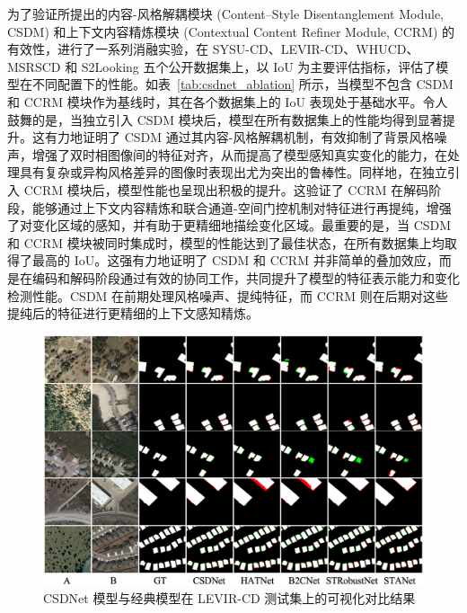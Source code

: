 为了验证所提出的内容-风格解耦模块 (Content–Style Disentanglement Module, CSDM) 和上下文内容精炼模块 (Contextual Content Refiner Module, CCRM) 的有效性，进行了一系列消融实验，在 SYSU-CD、LEVIR-CD、WHUCD、MSRSCD 和 S2Looking 五个公开数据集上，以 IoU 为主要评估指标，评估了模型在不同配置下的性能。如表~\ref{tab:csdnet_ablation} 所示，当模型不包含 CSDM 和 CCRM 模块作为基线时，其在各个数据集上的 IoU 表现处于基础水平。令人鼓舞的是，当独立引入 CSDM 模块后，模型在所有数据集上的性能均得到显著提升。这有力地证明了 CSDM 通过其内容-风格解耦机制，有效抑制了背景风格噪声，增强了双时相图像间的特征对齐，从而提高了模型感知真实变化的能力，在处理具有复杂或异构风格差异的图像时表现出尤为突出的鲁棒性。同样地，在独立引入 CCRM 模块后，模型性能也呈现出积极的提升。这验证了 CCRM 在解码阶段，能够通过上下文内容精炼和联合通道-空间门控机制对特征进行再提纯，增强了对变化区域的感知，并有助于更精细地描绘变化区域。最重要的是，当 CSDM 和 CCRM 模块被同时集成时，模型的性能达到了最佳状态，在所有数据集上均取得了最高的 IoU。这强有力地证明了 CSDM 和 CCRM 并非简单的叠加效应，而是在编码和解码阶段通过有效的协同工作，共同提升了模型的特征表示能力和变化检测性能。CSDM 在前期处理风格噪声、提纯特征，而 CCRM 则在后期对这些提纯后的特征进行更精细的上下文感知精炼。


\begin{figure}[!htb]
	\centering
	\includegraphics[width=\linewidth]{paper_figures/基于双时相遥感影像风格解缠和内容细化增强遥感变化检测方法/csdnet_levir.png}
    \caption{CSDNet 模型与经典模型在 LEVIR-CD 测试集上的可视化对比结果}
	\label{fig:csdnet_levir}
\end{figure}

